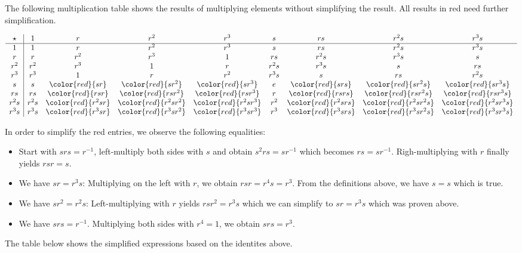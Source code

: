 The following multiplication table shows the results of multiplying
elements without simplifying the result. All results in red need further
simplification.

\[
\begin{array}{c|cccccccc}
\star   & 1    & r & r^2  & r^3 & s & rs & r^2s & r^3s \\
\hline
1 & 1 & r & r^2 & r^3 & s & rs & r^2s & r^3s \\
r & r & r^2 & r^3 & 1 & rs & r^2s & r^3s  & s \\
r^2 & r^2 & r^3 & 1 & r & r^2 s & r^3s & s & rs \\
r^3 & r^3 & 1 & r & r^2 & r^3s & s & rs & r^2s \\
s  &  s & \color{red}{sr} & \color{red}{sr^2} & \color{red}{sr^3} & e & \color{red}{srs}  & \color{red}{sr^2s} & \color{red}{sr^3s} \\
rs & rs & \color{red}{rsr} & \color{red}{rsr^2} & \color{red}{rsr^3} & r & \color{red}{rsrs}  & \color{red}{rsr^2s} & \color{red}{rsr^3s} \\
r^2s & r^2s & \color{red}{r^2sr} & \color{red}{r^2sr^2} & \color{red}{r^2sr^3} & r^2 & \color{red}{r^2srs}  & \color{red}{r^2sr^2s} & \color{red}{r^2sr^3s} \\
r^3s & r^3s & \color{red}{r^3sr} & \color{red}{r^3sr^2} & \color{red}{r^3sr^3} & r^3 & \color{red}{r^3srs} & \color{red}{r^3sr^2s} & \color{red}{r^3sr^3s}
\end{array}
\]

In order to simplify the red entries, we observe the following
equalities:

\begin{itemize}
\item
  Start with \(srs = r^{-1}\), left-multiply both sides with \(s\) and
  obtain \(s^2rs = s r^{-1}\) which becomes \(rs = s r^{-1}\).
  Righ-multiplying with \(r\) finally yields \(rsr = s\).
\item
  We have \(sr = r^3 s\): Multiplying on the left with \(r\), we obtain
  \(rsr = r^4 s = r^3\). From the definitions above, we have \(s = s\)
  which is true.
\item
  We have \(sr^2 = r^2s\): Left-multiplying with \(r\) yields
  \(rsr^2 = r^3s\) which we can simplify to \(sr = r^3s\) which was
  proven above.
\item
  We have \(srs = r^{-1}\). Multiplying both sides with \(r^4 = 1\), we
  obtain \(srs = r^3\).
\end{itemize}

The table below shows the simplified expressions based on the identites
above.

